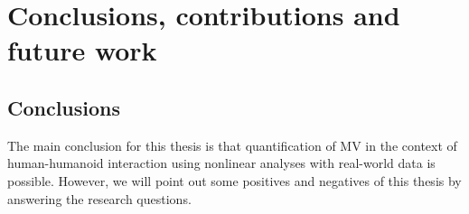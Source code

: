 		\chapter{Conclusions, contributions and future work}



\section{Conclusions}

The main conclusion for this thesis is that quantification of MV in the 
context of human-humanoid interaction using nonlinear analyses
with real-world data is possible. However, we will point out some positives
and negatives of this thesis by answering the research questions.


